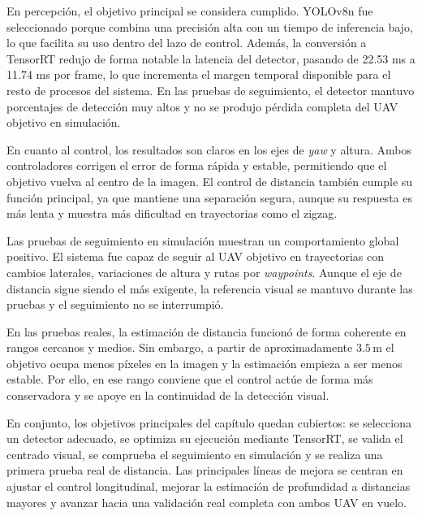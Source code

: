 \vspace{0.3cm}

En percepción, el objetivo principal se considera cumplido. YOLOv8n fue seleccionado porque combina una precisión alta con un tiempo de inferencia bajo, lo que facilita su uso dentro del lazo de control. Además, la conversión a TensorRT redujo de forma notable la latencia del detector, pasando de 22.53 ms a 11.74 ms por frame, lo que incrementa el margen temporal disponible para el resto de procesos del sistema. En las pruebas de seguimiento, el detector mantuvo porcentajes de detección muy altos y no se produjo pérdida completa del UAV objetivo en simulación.

\vspace{0.2cm}

En cuanto al control, los resultados son claros en los ejes de \textit{yaw} y altura. Ambos controladores corrigen el error de forma rápida y estable, permitiendo que el objetivo vuelva al centro de la imagen. El control de distancia también cumple su función principal, ya que mantiene una separación segura, aunque su respuesta es más lenta y muestra más dificultad en trayectorias como el zigzag.

\vspace{0.2cm}

Las pruebas de seguimiento en simulación muestran un comportamiento global positivo. El sistema fue capaz de seguir al UAV objetivo en trayectorias con cambios laterales, variaciones de altura y rutas por \textit{waypoints}. Aunque el eje de distancia sigue siendo el más exigente, la referencia visual se mantuvo durante las pruebas y el seguimiento no se interrumpió.

\vspace{0.2cm}

En las pruebas reales, la estimación de distancia funcionó de forma coherente en rangos cercanos y medios. Sin embargo, a partir de aproximadamente $3.5\,\mathrm{m}$ el objetivo ocupa menos píxeles en la imagen y la estimación empieza a ser menos estable. Por ello, en ese rango conviene que el control actúe de forma más conservadora y se apoye en la continuidad de la detección visual.

\vspace{0.3cm}

En conjunto, los objetivos principales del capítulo quedan cubiertos: se selecciona un detector adecuado, se optimiza su ejecución mediante TensorRT, se valida el centrado visual, se comprueba el seguimiento en simulación y se realiza una primera prueba real de distancia. Las principales líneas de mejora se centran en ajustar el control longitudinal, mejorar la estimación de profundidad a distancias mayores y avanzar hacia una validación real completa con ambos UAV en vuelo.
